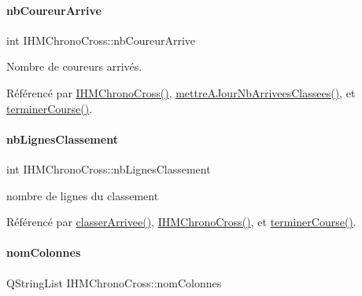 \paragraph{\texorpdfstring{nb\+Coureur\+Arrive}{nbCoureurArrive}}
{\footnotesize\ttfamily int I\+H\+M\+Chrono\+Cross\+::nb\+Coureur\+Arrive\hspace{0.3cm}{\ttfamily [private]}}



Nombre de coureurs arrivés. 



Référencé par \hyperlink{class_i_h_m_chrono_cross_a479fc90733fba3e65fb06aa4a3adc02e}{I\+H\+M\+Chrono\+Cross()}, \hyperlink{class_i_h_m_chrono_cross_a3d786cb4b5c5e3a4bd566f19409601d5}{mettre\+A\+Jour\+Nb\+Arrivees\+Classees()}, et \hyperlink{class_i_h_m_chrono_cross_ac89c6ec3040e8b787f1fbdb670405023}{terminer\+Course()}.

\mbox{\label{class_i_h_m_chrono_cross_a86ed3469ca99988211bcf0970527c119}} 
\paragraph{\texorpdfstring{nb\+Lignes\+Classement}{nbLignesClassement}}
{\footnotesize\ttfamily int I\+H\+M\+Chrono\+Cross\+::nb\+Lignes\+Classement\hspace{0.3cm}{\ttfamily [private]}}



nombre de lignes du classement 



Référencé par \hyperlink{class_i_h_m_chrono_cross_a5e9b561659ba63d2739335b8ab432cbf}{classer\+Arrivee()}, \hyperlink{class_i_h_m_chrono_cross_a479fc90733fba3e65fb06aa4a3adc02e}{I\+H\+M\+Chrono\+Cross()}, et \hyperlink{class_i_h_m_chrono_cross_ac89c6ec3040e8b787f1fbdb670405023}{terminer\+Course()}.

\mbox{\label{class_i_h_m_chrono_cross_a21f1b0ba82ff1b4a7b842b5f3c411e60}} 
\paragraph{\texorpdfstring{nom\+Colonnes}{nomColonnes}}
{\footnotesize\ttfamily Q\+String\+List I\+H\+M\+Chrono\+Cross\+::nom\+Colonnes\hspace{0.3cm}{\ttfamily [private]}}



